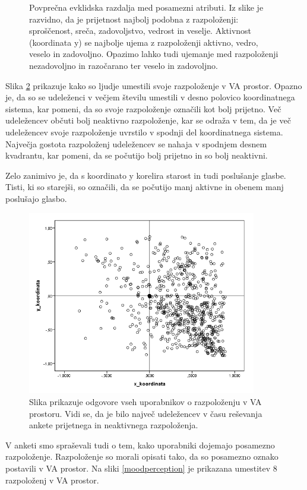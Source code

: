 \documentclass[a4paper, 12pt]{book}
\begin{document}
{\begin{figure}[hbt]
\caption{Povprečna evklidska razdalja med posamezni atributi. Iz slike je razvidno, da je prijetnost najbolj podobna z razpoloženji: sproščenost, sreča, zadovoljstvo, vedrost in veselje. Aktivnost (koordinata y) se najbolje ujema z razpoloženji aktivno, vedro, veselo in zadovoljno. Opazimo lahko tudi ujemanje med razpoloženji nezadovoljno in razočarano ter veselo in zadovoljno.}
\label{prisotnost_kor}
\end{figure}

Slika \ref{razpolozenjeva} prikazuje kako so ljudje umestili svoje razpoloženje v VA prostor. Opazno je, da so se udeleženci v večjem številu umestili v desno polovico koordinatnega sistema, kar pomeni, da so svoje razpoloženje označili kot bolj prijetno. Več udeležencev občuti bolj neaktivno razpoloženje, kar se odraža v tem, da je več udeležencev svoje razpoloženje uvrstilo v spodnji del koordinatnega sistema. Največja gostota razpoloženj udeležencev se nahaja v spodnjem desnem kvadrantu, kar pomeni, da se počutijo bolj prijetno in so bolj neaktivni. 

Zelo zanimivo je, da s koordinato y korelira starost in tudi poslušanje glasbe. Tisti, ki so starejši, so označili, da se počutijo manj aktivne in obenem manj poslušajo glasbo. 

\begin{figure}[hbt]
\centering
\includegraphics[width=10cm]{images/vamood.png}

\caption{Slika prikazuje odgovore vseh uporabnikov o razpoloženju v VA prostoru. Vidi se, da je bilo največ udeležencev v času reševanja ankete prijetnega in neaktivnega razpoloženja.  }
\label{razpolozenjeva}
\end{figure}

V anketi smo spraševali tudi o tem, kako uporabniki dojemajo posamezno razpoloženje. Razpoloženje so morali opisati tako, da so posamezno oznako postavili v VA prostor. Na sliki \ref{moodperception} je prikazana umestitev 8 razpoloženj v VA prostor. 

}
\end{document}
